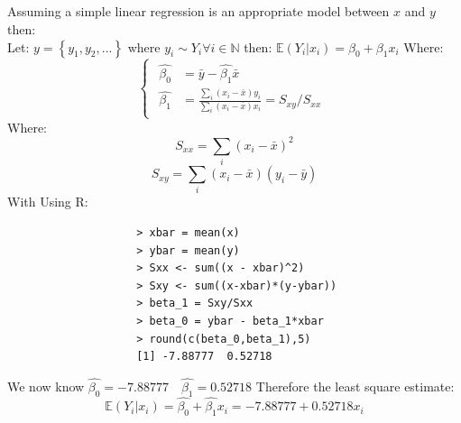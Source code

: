 \documentclass[a4paper]{article}
\begin{document}
	\newpage
	\subsection{}
		Assuming a simple linear regression is an appropriate model between \(x\) and \(y\) then:
			\\Let: \(y = \left\{y_1, y_2, ...\right\}\) where \(y_i \sim Y_i \forall i \in \mathbb{N}\) then:
			 \(\mathbb{E}(Y_i|x_i) = \beta_0 + \beta_1x_i\)
			 Where:
				\[\begin{cases}
					\begin{split}
						\hat{\beta_0} &= \bar{y} - \hat{\beta_1}\bar{x}\\
						\hat{\beta_1} &= \frac{\sum_i (x_i - \bar{x})y_i}{\sum_i (x_i - \bar{x})x_i} = S_{xy}/S_{xx}
					\end{split}
				\end{cases}\]
			Where:
				\[S_{xx} = \sum_i(x_i - \bar{x})^2\]
				\[S_{xy} = \sum_i(x_i - \bar{x})(y_i - \bar{y})\]
			With Using R:
				\begin{verbatim}
					> xbar = mean(x)
					> ybar = mean(y)
					> Sxx <- sum((x - xbar)^2)
					> Sxy <- sum((x-xbar)*(y-ybar))
					> beta_1 = Sxy/Sxx
					> beta_0 = ybar - beta_1*xbar
					> round(c(beta_0,beta_1),5)
					[1] -7.88777  0.52718
				\end{verbatim}
				We now know \(\hat{\beta_0} = -7.88777 \quad \hat{\beta_1} = 0.52718\)
			Therefore the least square estimate:
				\[\mathbb{E}(Y_i|x_i) = \hat{\beta_0} + \hat{\beta_1}x_i = -7.88777 + 0.52718x_i\]

	\newpage
\end{document}
